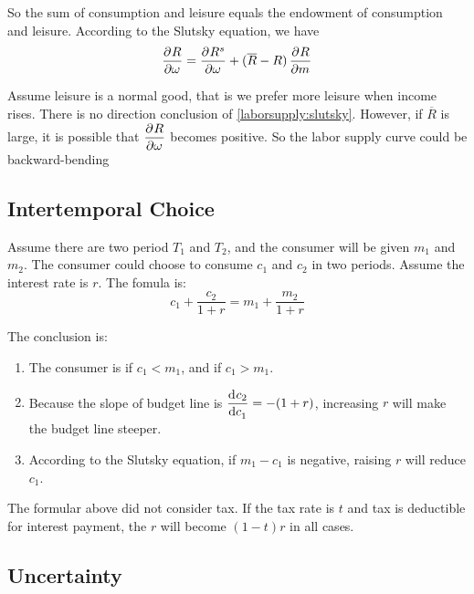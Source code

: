 So the sum of consumption and leisure equals the endowment of consumption and leisure. According to the Slutsky equation, we have 
\begin{equation}\label{laborsupply:slutsky}
    \dpd{R}{\omega} = \dpd{R^s}{\omega} + (\overline{R} - R)\dpd{R}{m}
\end{equation}

Assume leisure is a normal good, that is we prefer more leisure when income rises. There is no direction conclusion of \eqref{laborsupply:slutsky}. However, if $\overline{R}$ is large, it is possible that $\dpd{R}{\omega}$ becomes positive. So the labor supply curve could be backward-bending



\subsection{Intertemporal Choice}

Assume there are two period $T_1$ and $T_2$, and the consumer will be given $m_1$ and $m_2$. The consumer could choose to consume $c_1$ and $c_2$ in two periods. Assume the interest rate is $r$. The fomula is:
\begin{equation}
    c_1 + \frac{c_2}{1+r} = m_1 + \frac{m_2}{1+r}
\end{equation}

The conclusion is:
\begin{enumerate}
    \item The consumer is  if $c_1 < m_1$, and  if $c_1 > m_1$. 
    \item Because the slope of budget line is $\dod{c_2}{c_1} = - (1+r)$, increasing $r$ will make the budget line steeper. 
    \item According to the Slutsky equation, if $m_1 - c_1$ is negative, raising $r$ will reduce $c_1$.
\end{enumerate}

The formular above did not consider tax. If the tax rate is $t$ and tax is deductible for interest payment, the $r$ will become $(1-t)r$ in all cases.


\subsection{Uncertainty}

